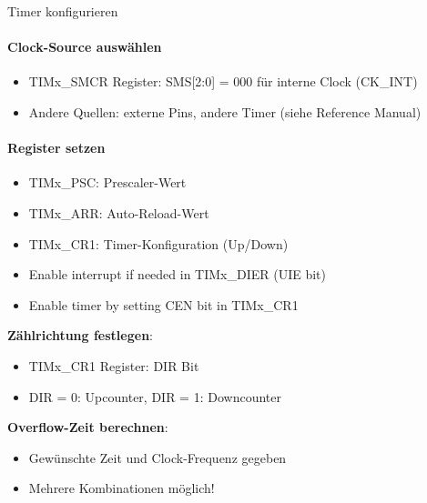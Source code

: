 \begin{KR}{Timer konfigurieren}
    \paragraph{Clock-Source auswählen}
    \begin{itemize}
        \item TIMx\_SMCR Register: SMS[2:0] = 000 für interne Clock (CK\_INT)
        \item Andere Quellen: externe Pins, andere Timer (siehe Reference Manual)
    \end{itemize}

    \paragraph{Register setzen}

    \begin{minipage}{0.55\linewidth}
    \begin{itemize}
        \item TIMx\_PSC: Prescaler-Wert
        \item TIMx\_ARR: Auto-Reload-Wert
        \item TIMx\_CR1: Timer-Konfiguration (Up/Down)
        \item Enable interrupt if needed in TIMx\_DIER (UIE bit)
        \item Enable timer by setting CEN bit in TIMx\_CR1
    \end{itemize}
    \end{minipage}
    \begin{minipage}{0.45\linewidth}    
    \textbf{Zählrichtung festlegen}:
    \begin{itemize}
        \item TIMx\_CR1 Register: DIR Bit
        \item DIR = 0: Upcounter, DIR = 1: Downcounter
    \end{itemize}
    
    \textbf{Overflow-Zeit berechnen}:
    \begin{itemize}
        \item Gewünschte Zeit und Clock-Frequenz gegeben
        \item Mehrere Kombinationen möglich!
    \end{itemize}
    \end{minipage}
\end{KR}





